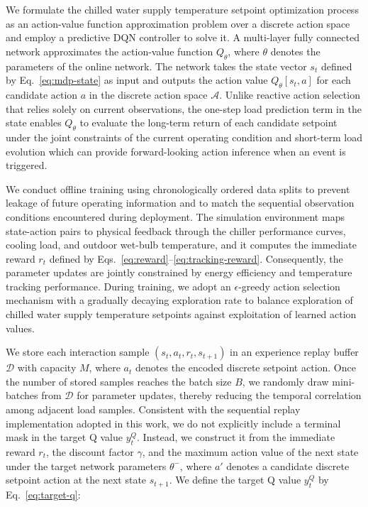\documentclass[preprint,12pt,number]{elsarticle}
\begin{document}
We formulate the chilled water supply temperature setpoint optimization process as an action-value function approximation problem over a discrete action space and employ a predictive DQN controller to solve it. A multi-layer fully connected network approximates the action-value function \(Q_{\theta}\), where \(\theta\) denotes the parameters of the online network. The network takes the state vector \(s_t\) defined by Eq.~\eqref{eq:mdp-state} as input and outputs the action value \(Q_{\theta}[s_t,a]\) for each candidate action \(a\) in the discrete action space \(\mathcal{A}\). Unlike reactive action selection that relies solely on current observations, the one-step load prediction term in the state enables \(Q_{\theta}\) to evaluate the long-term return of each candidate setpoint under the joint constraints of the current operating condition and short-term load evolution which can provide forward-looking action inference when an event is triggered.

We conduct offline training using chronologically ordered data splits to prevent leakage of future operating information and to match the sequential observation conditions encountered during deployment. The simulation environment maps state-action pairs to physical feedback through the chiller performance curves, cooling load, and outdoor wet-bulb temperature, and it computes the immediate reward \(r_t\) defined by Eqs.~\eqref{eq:reward}--\eqref{eq:tracking-reward}. Consequently, the parameter updates are jointly constrained by energy efficiency and temperature tracking performance. During training, we adopt an \(\epsilon\)-greedy action selection mechanism with a gradually decaying exploration rate to balance exploration of chilled water supply temperature setpoints against exploitation of learned action values.

We store each interaction sample \((s_t,a_t,r_t,s_{t+1})\) in an experience replay buffer \(\mathcal{D}\) with capacity \(M\), where \(a_t\) denotes the encoded discrete setpoint action. Once the number of stored samples reaches the batch size \(B\), we randomly draw mini-batches from \(\mathcal{D}\) for parameter updates, thereby reducing the temporal correlation among adjacent load samples. Consistent with the sequential replay implementation adopted in this work, we do not explicitly include a terminal mask in the target Q value \(y_t^{Q}\). Instead, we construct it from the immediate reward \(r_t\), the discount factor \(\gamma\), and the maximum action value of the next state under the target network parameters \(\theta^{-}\), where \(a'\) denotes a candidate discrete setpoint action at the next state \(s_{t+1}\). We define the target Q value \(y_t^{Q}\) by Eq.~\eqref{eq:target-q}:
\end{document}
